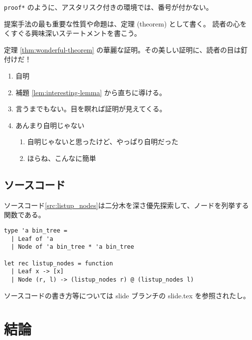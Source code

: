 \documentclass{sumiilab-paper}
\begin{document}
\begin{proof*}
  \lstinline|proof*| のように、アスタリスク付きの環境では、番号が付かない。
\end{proof*}

\begin{theorem}
  \label{thm:wonderful-theorem}
  提案手法の最も重要な性質や命題は、定理 (theorem) として書く。
  読者の心をくすぐる興味深いステートメントを書こう。
\end{theorem}

\begin{proof*}
  定理 \ref{thm:wonderful-theorem} の華麗な証明。その美しい証明に、読者の目は釘付けだ！
  \begin{enumerate}[leftmargin=0pt,itemindent=*,label=Case \arabic*.]
  \item 自明
  \item 補題 \ref{lem:interesting-lemma} から直ちに導ける。
  \item 言うまでもない。目を瞑れば証明が見えてくる。
  \item あんまり自明じゃない
    \begin{enumerate}[label=(\roman*)]
    \item 自明じゃないと思ったけど、やっぱり自明だった
    \item ほらね、こんなに簡単
    \end{enumerate}
  \end{enumerate}
\end{proof*}

\section{ソースコード}

ソースコード\ref{src:listup_nodes}は二分木を深さ優先探索して、ノードを列挙する関数である。
\begin{lstlisting}[caption=二分木のノードのリストアップ,label=src:listup_nodes]
type 'a bin_tree =
  | Leaf of 'a
  | Node of 'a bin_tree * 'a bin_tree

let rec listup_nodes = function
  | Leaf x -> [x]
  | Node (r, l) -> (listup_nodes r) @ (listup_nodes l)
\end{lstlisting}
ソースコードの書き方等については slide ブランチの slide.tex を参照されたし。

\chapter{結論}



\end{document}
